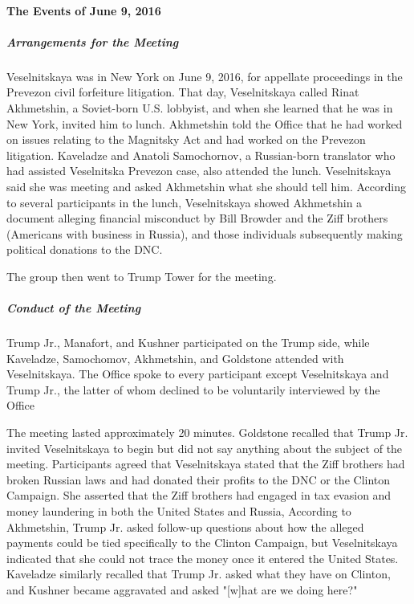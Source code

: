 \paragraph{The Events of June 9, 2016}

\subparagraph{Arrangements for the Meeting}

Veselnitskaya was in New York on June 9, 2016, for appellate proceedings in the Prevezon civil forfeiture litigation.%
That day, Veselnitskaya called Rinat Akhmetshin, a Soviet-born U.S. lobbyist,
and when she learned that he was in New York, invited him to lunch.%
Akhmetshin told the Office that he had worked on issues relating to the Magnitsky Act and had worked on the Prevezon litigation.%
Kaveladze and Anatoli Samochornov, a Russian-born translator who had assisted Veselnitska Prevezon case, also attended the lunch.%
 Veselnitskaya said she was meeting  and asked Akhmetshin what she should tell him.%
According to several participants in the lunch, Veselnitskaya showed Akhmetshin a document alleging financial misconduct by Bill Browder and the Ziff brothers (Americans with business in Russia), and those individuals subsequently making political donations to the DNC.%

The group then went to Trump Tower for the meeting.%

\subparagraph{Conduct of the Meeting}

Trump Jr., Manafort, and Kushner participated on the Trump side, while Kaveladze, Samochomov, Akhmetshin, and Goldstone attended with Veselnitskaya.%
The Office spoke to every participant except Veselnitskaya and Trump Jr., the latter of whom declined to be voluntarily interviewed by the Office

The meeting lasted approximately 20 minutes.%
 Goldstone recalled that Trump Jr. invited Veselnitskaya to begin but did not say anything about the subject of the meeting.%
Participants agreed that Veselnitskaya stated that the Ziff brothers had broken Russian laws and had donated their profits to the DNC or the Clinton Campaign.%
She asserted that the Ziff brothers had engaged in tax evasion and money laundering in both the United States and Russia,%
According to Akhmetshin, Trump Jr. asked follow-up questions about how the alleged payments could be tied specifically to the Clinton Campaign, but Veselnitskaya indicated that she could not trace the money once it entered the United States.%
Kaveladze similarly recalled that Trump Jr. asked what they have on Clinton, and Kushner became aggravated and asked "[w]hat are we doing here?"%

